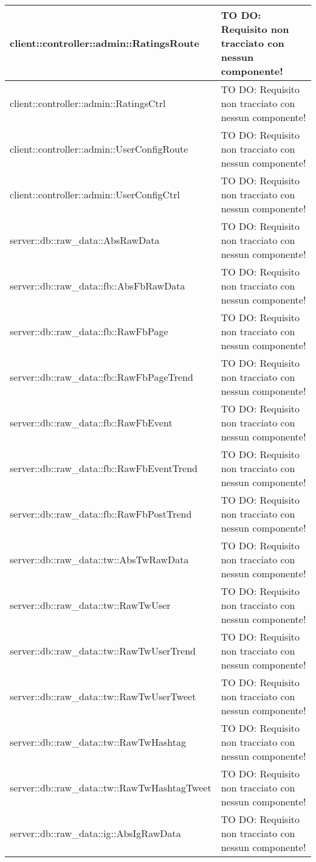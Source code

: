 \begin{center}
\begin{longtable}{| p{11cm} | p{2.5cm} |}
\hline
client::controller::admin::RatingsRoute & TO DO: Requisito non tracciato con nessun componente! \\
\hline
client::controller::admin::RatingsCtrl & TO DO: Requisito non tracciato con nessun componente! \\
\hline
client::controller::admin::UserConfigRoute & TO DO: Requisito non tracciato con nessun componente! \\
\hline
client::controller::admin::UserConfigCtrl & TO DO: Requisito non tracciato con nessun componente! \\
\hline
server::db::raw\_data::AbsRawData & TO DO: Requisito non tracciato con nessun componente! \\
\hline
server::db::raw\_data::fb::AbsFbRawData & TO DO: Requisito non tracciato con nessun componente! \\
\hline
server::db::raw\_data::fb::RawFbPage & TO DO: Requisito non tracciato con nessun componente! \\
\hline
server::db::raw\_data::fb::RawFbPageTrend & TO DO: Requisito non tracciato con nessun componente! \\
\hline
server::db::raw\_data::fb::RawFbEvent & TO DO: Requisito non tracciato con nessun componente! \\
\hline
server::db::raw\_data::fb::RawFbEventTrend & TO DO: Requisito non tracciato con nessun componente! \\
\hline
server::db::raw\_data::fb::RawFbPostTrend & TO DO: Requisito non tracciato con nessun componente! \\
\hline
server::db::raw\_data::tw::AbsTwRawData & TO DO: Requisito non tracciato con nessun componente! \\
\hline
server::db::raw\_data::tw::RawTwUser & TO DO: Requisito non tracciato con nessun componente! \\
\hline
server::db::raw\_data::tw::RawTwUserTrend & TO DO: Requisito non tracciato con nessun componente! \\
\hline
server::db::raw\_data::tw::RawTwUserTweet & TO DO: Requisito non tracciato con nessun componente! \\
\hline
server::db::raw\_data::tw::RawTwHashtag & TO DO: Requisito non tracciato con nessun componente! \\
\hline
server::db::raw\_data::tw::RawTwHashtagTweet & TO DO: Requisito non tracciato con nessun componente! \\
\hline
server::db::raw\_data::ig::AbsIgRawData & TO DO: Requisito non tracciato con nessun componente! \\

\end{longtable}
\end{center}
